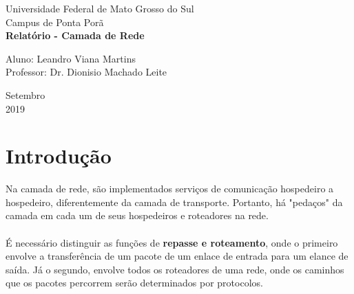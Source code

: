 \documentclass[a4paper, 12pt]{article}
\begin{document}

\begin{titlepage}
	\begin{center}
	

		\large{Universidade Federal de Mato Grosso do Sul}\\
		\large{Campus de Ponta Porã}\\ 
		\vspace{15pt}
        \vspace{95pt}
        \textbf{\LARGE{Relatório - Camada de Rede }}\\
		\vspace{3,5cm}
	\end{center}
	
	\begin{flushleft}
		\begin{tabbing}
			Aluno: Leandro Viana Martins\\
			Professor: Dr. Dionisio Machado Leite\\
	\end{tabbing}
 \end{flushleft}
	\vspace{1cm}
	
	\begin{center}
		\vspace{\fill}
			Setembro\\
            2019
	\end{center}
\end{titlepage}

\newpage
\section{Introdução}
Na camada de rede, são implementados serviços de comunicação hospedeiro a hospedeiro, diferentemente da camada de transporte. 
Portanto, há "pedaços" da camada em cada um de seus hospedeiros e roteadores na rede.
\\
\\
É necessário distinguir as funções de \textbf{repasse e roteamento}, onde o primeiro envolve a transferência de um pacote de um enlace
de entrada para um elance de saída. Já o segundo, envolve todos os roteadores de uma rede, onde os caminhos que os pacotes 
percorrem serão determinados por protocolos.
\end{document}
